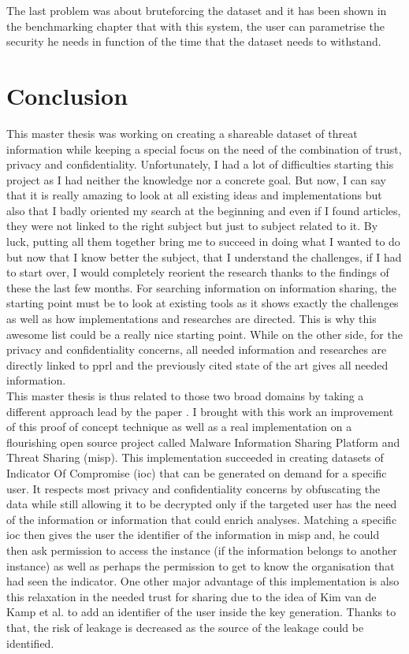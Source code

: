\documentclass{eplmastersthesis}
\begin{document}
The last problem was about bruteforcing the dataset and it has been shown in the benchmarking chapter that with this system, the user can parametrise the security he needs in function of the time that the dataset needs to withstand. 

\section{Conclusion}
This master thesis was working on creating a shareable dataset of threat information while keeping a special focus on the need of the combination of trust, privacy and confidentiality.
Unfortunately, I had a lot of difficulties starting this project as I had neither the knowledge nor a concrete goal. But now, I can say that it is really amazing to look at all existing ideas and implementations but also that I badly oriented my search at the beginning and even if I found articles, they were not linked to the right subject but just to subject related to it. By luck, putting all them together bring me to succeed in doing what I wanted to do but now that I know better the subject, that I understand the challenges, if I had to start over, I would completely reorient the research thanks to the findings of these the last few months.
For searching information on information sharing, the starting point must be to look at existing tools as it shows exactly the challenges as well as how implementations and researches are directed. This is why this awesome list \cite{AwesomeTreat} could be a really nice starting point.
While on the other side, for the privacy and confidentiality concerns, all needed information and researches are directly linked to \gls{pprl} and the previously cited state of the art \cite{vatsalanprivacy} gives all needed information.\\

This master thesis is thus related to those two broad domains by taking a different approach lead by the paper \cite{van2016private}. I brought with this work an improvement of this proof of concept technique as well as a real implementation on a flourishing open source project called Malware Information Sharing Platform and Threat Sharing (\gls{misp}).
This implementation succeeded in creating datasets of Indicator Of Compromise (\gls{ioc}) that can be generated on demand for a specific user. It respects most privacy and confidentiality concerns by obfuscating the data while still allowing it to be decrypted only if the targeted user has the need of the information or information that could enrich analyses.
Matching a specific \gls{ioc} then gives the user the identifier of the information in \gls{misp} and, he could then ask permission to access the instance (if the information belongs to another instance) as well as perhaps the permission to get to know the organisation that had seen the indicator.
One other major advantage of this implementation is also this relaxation in the needed trust for sharing due to the idea of Kim van de Kamp et al. to add an identifier of the user inside the key generation. Thanks to that, the risk of leakage is decreased as the source of the leakage could be identified.\\


\printglossary



\newpage

\backcoverpage
\end{document}
